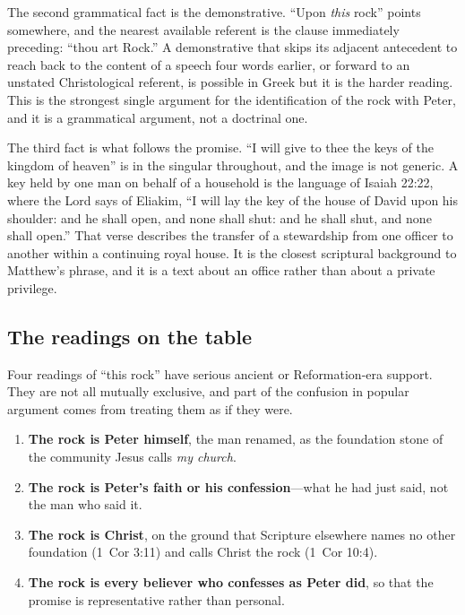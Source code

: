 The second grammatical fact is the demonstrative. ``Upon \emph{this} rock''
points somewhere, and the nearest available referent is the clause
immediately preceding: ``thou art Rock.'' A demonstrative that skips its
adjacent antecedent to reach back to the content of a speech four words
earlier, or forward to an unstated Christological referent, is possible in
Greek but it is the harder reading. This is the strongest single argument for
the identification of the rock with Peter, and it is a grammatical argument,
not a doctrinal one.

The third fact is what follows the promise. ``I will give to thee the keys of
the kingdom of heaven'' is in the singular throughout, and the image is not
generic. A key held by one man on behalf of a household is the language of
Isaiah 22:22, where the Lord says of Eliakim, ``I will lay the key of the
house of David upon his shoulder: and he shall open, and none shall shut: and
he shall shut, and none shall open.'' That verse describes the transfer of a
stewardship from one officer to another within a continuing royal house. It
is the closest scriptural background to Matthew's phrase, and it is a text
about an office rather than about a private privilege.

\subsection{The readings on the table}

Four readings of ``this rock'' have serious ancient or Reformation-era
support. They are not all mutually exclusive, and part of the confusion in
popular argument comes from treating them as if they were.

\begin{enumerate}
\item \textbf{The rock is Peter himself}, the man renamed, as the foundation
stone of the community Jesus calls \textit{my church}.
\item \textbf{The rock is Peter's faith or his confession}---what he had just
said, not the man who said it.
\item \textbf{The rock is Christ}, on the ground that Scripture elsewhere
names no other foundation (1~Cor 3:11) and calls Christ the rock
(1~Cor 10:4).
\item \textbf{The rock is every believer who confesses as Peter did}, so
that the promise is representative rather than personal.
\end{enumerate}

